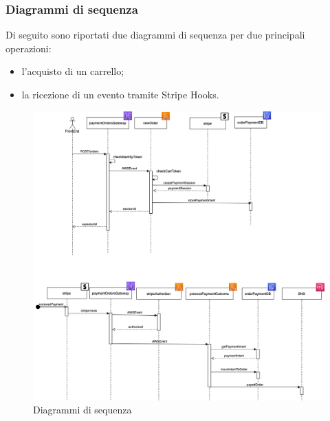 \subsubsection{Diagrammi di sequenza}
Di seguito sono riportati due diagrammi di sequenza per due principali operazioni:
\begin{itemize}
	\item l'acquisto di un carrello;
	\item la ricezione di un evento tramite Stripe Hooks.
\end{itemize}
\begin{figure}[H]
	\centering
	\includegraphics[scale=0.5]{Immagini/Backend/Diagrammiseq.png}
	\caption{Diagrammi di sequenza}
	\label{fig:Diagrammiseq}
\end{figure}